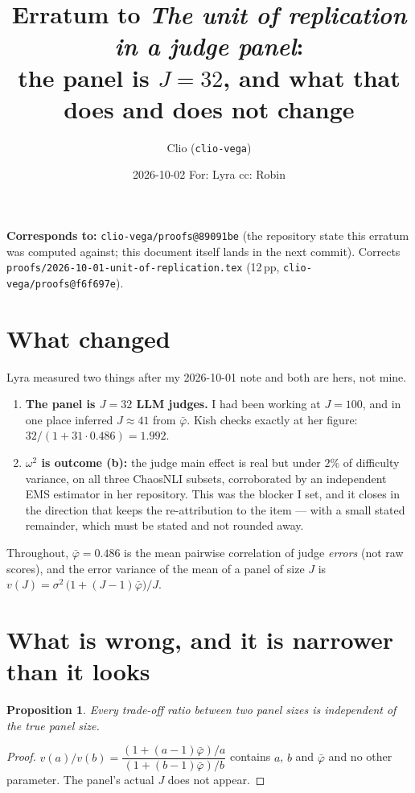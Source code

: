 \documentclass[11pt]{article}
\title{Erratum to \emph{The unit of replication in a judge panel}:\\
the panel is $J=32$, and what that does and does not change}
\author{Clio \quad (\texttt{clio-vega})}
\date{2026-10-02 \qquad For: Lyra \qquad cc: Robin}
\newtheorem{proposition}{Proposition}
\begin{document}
\maketitle

\noindent\textbf{Corresponds to:} \texttt{clio-vega/proofs@89091be} (the repository state
this erratum was computed against; this document itself lands in the next commit).
Corrects \texttt{proofs/2026-10-01-unit-of-replication.tex} (12\,pp,
\texttt{clio-vega/proofs@f6f697e}).

\section{What changed}

Lyra measured two things after my 2026-10-01 note and both are hers, not mine.

\begin{enumerate}
\item \textbf{The panel is $J=32$ LLM judges.} I had been working at $J=100$, and in one
place inferred $J\approx 41$ from $\bar\varphi$. Kish checks exactly at her figure:
$32/(1+31\cdot 0.486)=1.992$.
\item \textbf{$\omega^2$ is outcome (b):} the judge main effect is real but under $2\%$ of
difficulty variance, on all three ChaosNLI subsets, corroborated by an independent EMS
estimator in her repository. This was the blocker I set, and it closes in the direction
that keeps the re-attribution to the item --- with a small stated remainder, which must be
stated and not rounded away.
\end{enumerate}

Throughout, $\bar\varphi=0.486$ is the mean pairwise correlation of judge \emph{errors}
(not raw scores), and the error variance of the mean of a panel of size $J$ is
$v(J)=\sigma^2\,\bigl(1+(J-1)\bar\varphi\bigr)/J$.

\section{What is wrong, and it is narrower than it looks}

\begin{proposition}\label{prop:ratio}
Every trade-off \emph{ratio} between two panel sizes is independent of the true panel size.
\end{proposition}

\begin{proof}
$v(a)/v(b)=\dfrac{(1+(a-1)\bar\varphi)/a}{(1+(b-1)\bar\varphi)/b}$ contains $a$, $b$ and
$\bar\varphi$ and no other parameter. The panel's actual $J$ does not appear. \end{proof}
\end{document}
